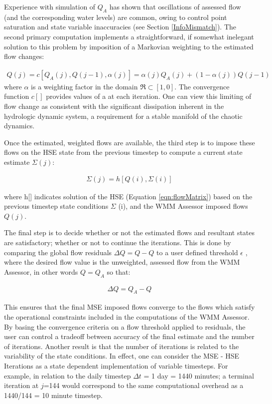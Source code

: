 Experience with simulation of $Q_A$ has shown that oscillations of
assessed flow (and the corresponding water levels) are common, owing
to control point saturation and state variable inaccuracies (see
Section \ref{InfoMismatch}). The second primary computation implements
a straightforward, if somewhat inelegant solution to this problem by
imposition of a Markovian weighting to the estimated flow changes:

\begin{align} \label{eqn:convergenceFunction}
  Q(j) = c[Q_A(j),Q(j - 1),\alpha(j)] = \alpha(j)Q_A(j) + (1 - \alpha(j))Q(j - 1)
\end{align}
where $\alpha$ is a weighting factor in the domain $\Re \subset
[1,0]$. The convergence function $c[]$ provides values of a at each
iteration. One can view this limiting of flow change as consistent
with the significant dissipation inherent in the hydrologic dynamic
system, a requirement for a stable manifold of the chaotic dynamics.

Once the estimated, weighted flows are available, the third step is to
impose these flows on the HSE state from the previous timestep to
compute a current state estimate $\Sigma (j)$:

\begin{align}
  \Sigma (j) = h \left [ Q(i), \Sigma (i) \right ]
\end{align}

where h[] indicates solution of the HSE (Equation
\ref{eqn:flowMatrix}) based on the previous timestep state conditions
$\Sigma$ (i), and the WMM Assessor imposed flows $Q(j)$.

The final step is to decide whether or not the estimated flows and
resultant states are satisfactory; whether or not to continue the
iterations. This is done by comparing the global flow residuals
$\Delta Q = Q-Q$ to a user defined threshold $\epsilon$ , where the
desired flow value is the unweighted, assessed flow from the WMM
Assessor, in other words $Q = Q_A$ so that:

\begin{align}
  \Delta Q = Q_A - Q
\end{align}

This ensures that the final MSE imposed flows converge to the flows
which satisfy the operational constraints included in the computations
of the WMM Assessor. By basing the convergence criteria on a flow
threshold applied to residuals, the user can control a tradeoff
between accuracy of the final estimate and the number of
iterations. Another result is that the number of iterations is related
to the variability of the state conditions. In effect, one can
consider the MSE - HSE Iterations as a state dependent implementation
of variable timesteps. For example, in relation to the daily timestep
$\Delta t$ = 1 day = 1440 minutes; a terminal iteration at $j$=144
would correspond to the same computational overhead as a 1440/144 = 10
minute timestep.

